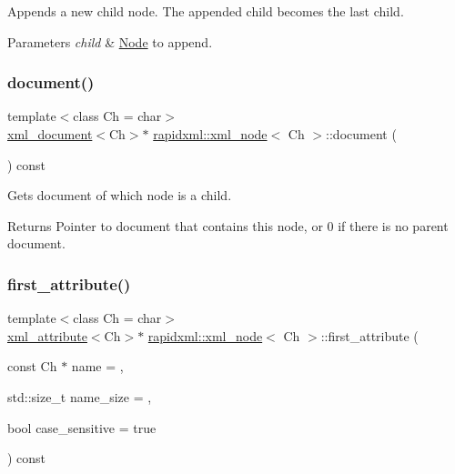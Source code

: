 Appends a new child node. The appended child becomes the last child. 
\begin{DoxyParams}{Parameters}
{\em child} & \hyperlink{classNode}{Node} to append. \\
\hline
\end{DoxyParams}
\mbox{\label{classrapidxml_1_1xml__node_af23d2d56182411e9261ca6974bfd767f}} 
\subsubsection{\texorpdfstring{document()}{document()}}
{\footnotesize\ttfamily template$<$class Ch = char$>$ \\
\hyperlink{classrapidxml_1_1xml__document}{xml\+\_\+document}$<$Ch$>$$\ast$ \hyperlink{classrapidxml_1_1xml__node}{rapidxml\+::xml\+\_\+node}$<$ Ch $>$\+::document (\begin{DoxyParamCaption}{ }\end{DoxyParamCaption}) const\hspace{0.3cm}{\ttfamily [inline]}}

Gets document of which node is a child. \begin{DoxyReturn}{Returns}
Pointer to document that contains this node, or 0 if there is no parent document. 
\end{DoxyReturn}
\mbox{\label{classrapidxml_1_1xml__node_ab816ab6f13ee4b0588d5b76b0697511c}} 
\subsubsection{\texorpdfstring{first\+\_\+attribute()}{first\_attribute()}}
{\footnotesize\ttfamily template$<$class Ch = char$>$ \\
\hyperlink{classrapidxml_1_1xml__attribute}{xml\+\_\+attribute}$<$Ch$>$$\ast$ \hyperlink{classrapidxml_1_1xml__node}{rapidxml\+::xml\+\_\+node}$<$ Ch $>$\+::first\+\_\+attribute (\begin{DoxyParamCaption}\item[{const Ch $\ast$}]{name = {},  }\item[{std\+::size\+\_\+t}]{name\+\_\+size = {},  }\item[{bool}]{case\+\_\+sensitive = {\ttfamily true} }\end{DoxyParamCaption}) const\hspace{0.3cm}{\ttfamily [inline]}}

